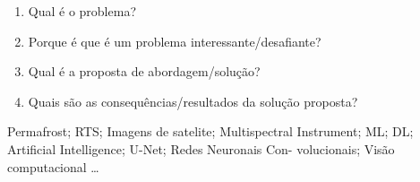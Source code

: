 





\begin{enumerate}
  \item Qual é o problema?
  \item Porque é que é um problema interessante/desafiante?
  \item Qual é a proposta de abordagem/solução?
  \item Quais são as consequências/resultados da solução proposta?
\end{enumerate}

%
%

\begin{keywords}
  Permafrost; \gls{RTS}; Imagens de satelite;  Multispectral Instrument; \gls{ML}; \gls{DL}; Artificial Intelligence; U-Net; Redes Neuronais Con-
  volucionais; Visão computacional \ldots
\end{keywords}
